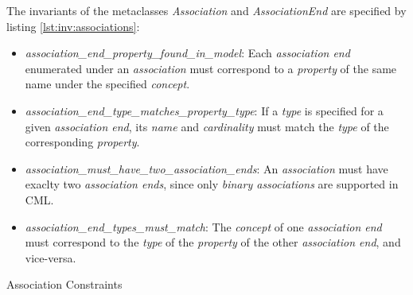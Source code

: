 The invariants of the metaclasses \emph{Association} and \emph{AssociationEnd}
are specified by listing \ref{lst:inv:associations}:

\begin{itemize}

\item \emph{association\_end\_property\_found\_in\_model}:
Each \emph{association end} enumerated under an \emph{association}
must correspond to a \emph{property} of the same name under the specified \emph{concept}.

\item \emph{association\_end\_type\_matches\_property\_type}:
If a \emph{type} is specified for a given \emph{association end},
its \emph{name} and \emph{cardinality} must match the \emph{type}
of the corresponding \emph{property}.

\item \emph{association\_must\_have\_two\_association\_ends}:
An \emph{association} must have exaclty two \emph{association ends},
since only \emph{binary associations} are supported in CML.

\item \emph{association\_end\_types\_must\_match}:
The \emph{concept} of one \emph{association end} must correspond
to the \emph{type} of the \emph{property} of the other \emph{association end},
and vice-versa.

\end{itemize}

\begin{code}

\caption{Association Constraints}
\label{lst:inv:associations}
\end{code}

